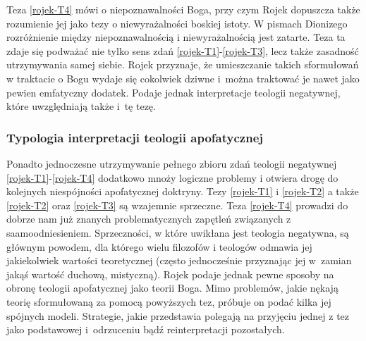 Teza \eqref{rojek-T4} mówi o niepoznawalności Boga, przy czym Rojek dopuszcza także rozumienie jej jako tezy o niewyrażalności boskiej istoty. W pismach Dionizego rozróżnienie między niepoznawalnością i niewyrażalnością jest zatarte. Teza ta zdaje się podważać nie tylko sens zdań \eqref{rojek-T1}-\eqref{rojek-T3}, lecz także zasadność utrzymywania samej siebie.
Rojek przyznaje, że umieszczanie
takich sformułowań w traktacie o Bogu wydaje się cokolwiek dziwne i~można traktować je nawet jako pewien emfatyczny dodatek. Podaje jednak
interpretacje teologii negatywnej, które uwzględniają także i~tę tezę.




\subsubsection{Typologia interpretacji teologii apofatycznej}








Ponadto jednoczesne utrzymywanie pełnego zbioru zdań teologii negatywnej \eqref{rojek-T1}-\eqref{rojek-T4}
dodatkowo mnoży logiczne problemy i otwiera drogę do kolejnych niespójności
apofatycznej doktryny.
Tezy \eqref{rojek-T1} i \eqref{rojek-T2} a także \eqref{rojek-T2} oraz \eqref{rojek-T3} są
wzajemnie sprzeczne. Teza \eqref{rojek-T4} prowadzi do dobrze nam już znanych problematycznych
zapętleń związanych z saamoodniesieniem. Sprzeczności, w które uwikłana jest teologia
negatywna, są głównym powodem, dla którego wielu filozofów i teologów
odmawia jej jakiekolwiek wartości teoretycznej (często jednocześnie przyznając jej w~zamian
jakąś wartość duchową, mistyczną). 
Rojek podaje jednak pewne sposoby na obronę teologii apofatycznej jako teorii Boga.
Mimo problemów, jakie nękają teorię sformułowaną za pomocą powyższych
tez, próbuje on podać kilka jej spójnych modeli. Strategie, jakie
przedstawia polegają na przyjęciu jednej z tez jako podstawowej
i~odrzuceniu bądź reinterpretacji pozostałych.



